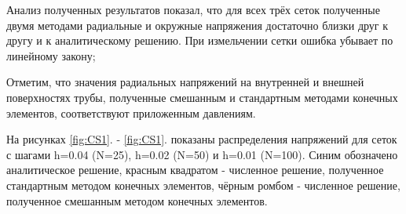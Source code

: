 \documentclass[a4paper,14pt]{extarticle}
\begin{document}
Анализ полученных результатов показал, что для всех трёх сеток полученные двумя методами радиальные и окружные напряжения достаточно близки друг к другу и к аналитическому решению. При измельчении сетки ошибка убывает по линейному закону;

Отметим, что значения радиальных напряжений на внутренней и внешней поверхностях трубы, полученные смешанным и стандартным методами конечных элементов, соответствуют приложенным давлениям. 

На рисунках \ref{fig:CS1}. - \ref{fig:CS1}. показаны распределения напряжений для сеток с шагами h=0.04 (N=25), h=0.02 (N=50) и h=0.01 (N=100). Синим обозначено аналитическое решение, красным квадратом - численное решение, полученное стандартным методом конечных элементов, чёрным ромбом - численное решение, полученное смешанным методом конечных элементов. 
	
\end{document}
